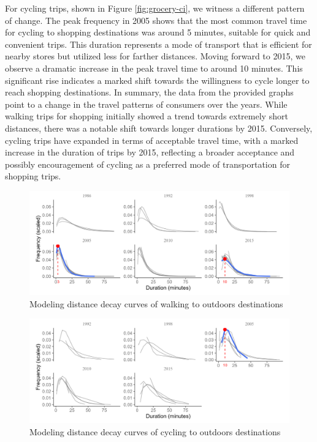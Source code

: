 \documentclass[
11pt, %
oneside, %
english, %
singlespacing, %
]{macthesis} %
\begin{document}
For cycling trips, shown in Figure \ref{fig:grocery-ci}, we witness a different pattern of change. The peak frequency in 2005 shows that the most common travel time for cycling to shopping destinations was around 5 minutes, suitable for quick and convenient trips. This duration represents a mode of transport that is efficient for nearby stores but utilized less for farther distances. Moving forward to 2015, we observe a dramatic increase in the peak travel time to around 10 minutes. This significant rise indicates a marked shift towards the willingness to cycle longer to reach shopping destinations.
In summary, the data from the provided graphs point to a change in the travel patterns of consumers over the years. While walking trips for shopping initially showed a trend towards extremely short distances, there was a notable shift towards longer durations by 2015. Conversely, cycling trips have expanded in terms of acceptable travel time, with a marked increase in the duration of trips by 2015, reflecting a broader acceptance and possibly encouragement of cycling as a preferred mode of transportation for shopping trips.

\newpage
\thispagestyle{empty}
\begin{landscape}

\begin{figure}

{\centering \includegraphics[width=0.9\linewidth]{figure/ch03-Fig11} 

}

\caption{Modeling distance decay curves of walking to outdoors destinations}\label{fig:outdoors-wi}
\end{figure}

\begin{figure}

{\centering \includegraphics[width=0.9\linewidth]{figure/ch03-Fig12} 

}

\caption{Modeling distance decay curves of cycling to outdoors destinations}\label{fig:outdoors-ci}
\end{figure}
\end{landscape}
\clearpage
\end{document}
